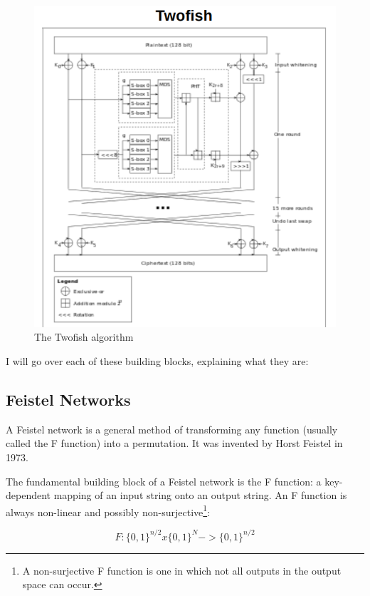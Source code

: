 \begin{figure}[htp]
  \centering
  \includegraphics[scale=0.4]{Graphics/twofish.png}
  \caption{The Twofish algorithm}
  \label{fig:twofish}
\end{figure}
I will go over each of these building blocks, explaining what they are:

\subsection{Feistel Networks}
A Feistel network is a general method of transforming any function (usually called the F function) into a permutation. It was invented by Horst Feistel in 1973.

The fundamental building block of a Feistel network is the F function: a key-dependent mapping of an input string onto an output string. An F function is always non-linear and possibly non-surjective\footnote{A non-surjective F function is one in which not all outputs in the output space can occur.}:

\begin{equation*}
  F : \lbrace 0, 1\rbrace^{n/2} x \lbrace0, 1\rbrace^N -> \lbrace 0, 1\rbrace^{n/2}
\end{equation*}


